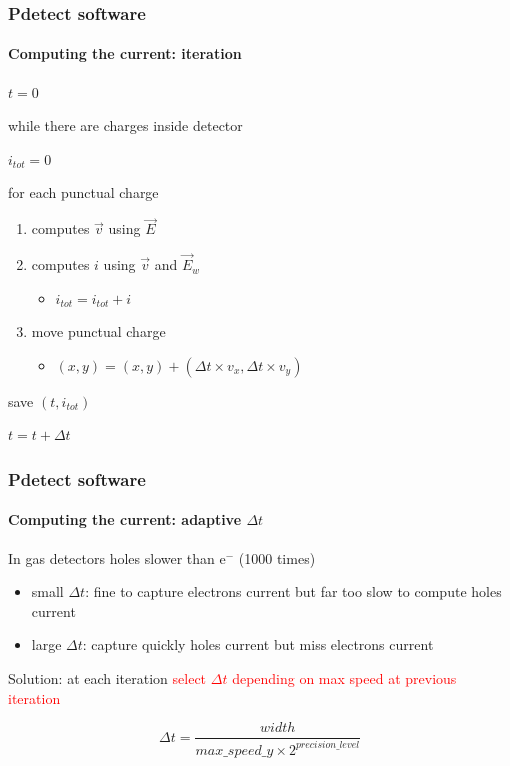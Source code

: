 \documentclass[14pt]{beamer}
\begin{document}
\begin{frame}
  \frametitle{Pdetect software}
  \framesubtitle{Computing the current: iteration}

$t=0$

while there are charges inside detector

\hspace{0.5cm} $i_{tot} = 0$

\hspace{0.5cm} for each punctual charge
\begin{enumerate}
  \addtolength{\itemindent}{1cm}
  \item computes $\vec{v}$ using $\vec{E}$
  \item computes $i$ using $\vec{v}$ and $\vec{E}_w$
  \begin{itemize}
    \item $i_{tot} = i_{tot}+i$
  \end{itemize}
  \item move punctual charge
  \begin{itemize}
    \item $(x,y) = (x,y) + (\Delta t \times v_x, \Delta t \times v_y)$
  \end{itemize}
\end{enumerate}

\hspace{0.5cm} save $(t,i_{tot})$

\hspace{0.5cm} $t = t+\Delta t$

\end{frame}

\begin{frame}
  \frametitle{Pdetect software}
  \framesubtitle{Computing the current: adaptive $\Delta t$}

  In gas detectors holes slower than e$^-$ (1000 times)
  \begin{itemize}
    \item small $\Delta t$: fine to capture electrons current but far too slow
    to compute holes current
    \item large $\Delta t$: capture quickly holes current but miss electrons current
  \end{itemize}

Solution: at each iteration \textcolor{red}{select $\Delta t$ depending on max speed at previous
iteration}

\[\Delta t = \frac{width}{max\_speed\_y \times 2^{precision\_level}}\]

\end{frame}
\end{document}
